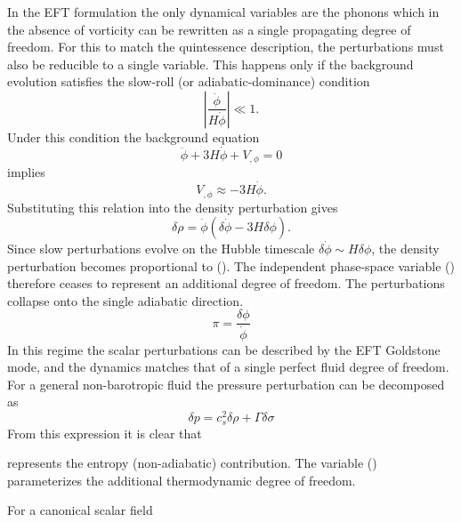 
In the EFT formulation the only dynamical variables are the phonons which in the absence of vorticity can be rewritten as a single propagating degree of freedom. For this to match the quintessence description, the perturbations must also be reducible to a single variable. This happens only if the background evolution satisfies the slow-roll (or adiabatic-dominance) condition
\begin{equation}
\left|\frac{\ddot\phi}{H\dot\phi}\right| \ll 1 .    
\end{equation}
Under this condition the background equation
\begin{equation}
\ddot\phi+3H\dot\phi+V_{,\phi}=0    
\end{equation}
implies
\begin{equation}
V_{,\phi}\approx -3H\dot\phi .    
\end{equation}
Substituting this relation into the density perturbation gives
\begin{equation}
\delta\rho=\dot\phi(\delta\dot\phi-3H\delta\phi).    
\end{equation}
Since slow perturbations evolve on the Hubble timescale $\delta\dot\phi \sim H\delta\phi$, the density perturbation becomes proportional to (\delta\phi). The independent phase-space variable (\delta\dot\phi) therefore ceases to represent an additional degree of freedom. The perturbations collapse onto the single adiabatic direction. 
\begin{equation}
\pi = \frac{\delta\phi}{\dot\phi}    
\end{equation}
In this regime the scalar perturbations can be described by the EFT Goldstone mode, and the dynamics matches that of a single perfect fluid degree of freedom.
For a general non-barotropic fluid the pressure perturbation can be decomposed as
\begin{equation}
\delta p =c_s^2\delta\rho
+\Gamma\delta\sigma    
\end{equation}
From this expression it is clear that 

represents the entropy (non-adiabatic) contribution. The variable (\sigma) parameterizes the additional thermodynamic degree of freedom.

For a canonical scalar field

